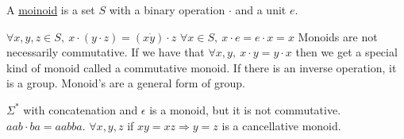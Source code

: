 \documentclass[../598comp.tex]{subfiles}
\begin{document}
\begin{definition}[monoid]
  A \ul{moinoid} is a set $S$ with a binary operation $\cdot$ and a unit $e$. 
  \begin{enumerate}
    \ii
    $\forall x, y, z \in S, \ x \cdot (y \cdot z) = (x \dot y) \cdot z$
    \ii
    $\forall x \in S, \ x \cdot e = e \cdot x = x$
    \ii
    Monoids are not necessarily commutative. If we have that $\forall x, y, \ x \cdot y = y \cdot x$ then we get a special kind of monoid called a commutative monoid.
    \ii
    If there is an inverse operation, it is a group. Monoid's are a general form of group.
  \end{enumerate} 
\end{definition} 

\begin{example}
  \begin{enumerate}
    \ii[]
    \ii
    $\Sigma^*$ with concatenation and $\epsilon$ is a monoid, but it is not commutative. $aab \cdot ba = aabba$.
    \ii
    $\forall x, y, z$ if $xy = xz \Rightarrow y = z$ is a cancellative monoid.
  \end{enumerate} 
\end{example} 
 
\end{document}
